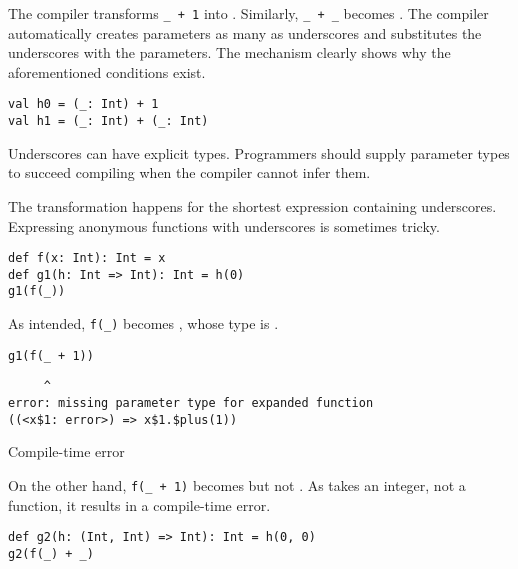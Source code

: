 The compiler transforms \verb!_ + 1! into .
Similarly, \verb!_ + _!
becomes . The compiler automatically creates parameters
as many as underscores and substitutes the underscores with the parameters. The
mechanism clearly shows why the aforementioned conditions exist.

\begin{verbatim}
val h0 = (_: Int) + 1
val h1 = (_: Int) + (_: Int)
\end{verbatim}

Underscores can have explicit types.
Programmers should supply parameter types to succeed compiling when
the compiler cannot infer them.

The transformation happens for the shortest expression containing underscores.
Expressing anonymous functions with underscores is sometimes tricky.

\begin{verbatim}
def f(x: Int): Int = x
def g1(h: Int => Int): Int = h(0)
g1(f(_))
\end{verbatim}

As intended, \verb!f(_)! becomes , whose type is .

\begin{verbatim}
g1(f(_ + 1))
\end{verbatim}
\vspace{-1em}
\begin{mdframed}[hidealllines=true,backgroundcolor=red!10,innerleftmargin=3pt,innerrightmargin=3pt,leftmargin=-3pt,rightmargin=-3pt]
\begin{verbatim}
     ^
error: missing parameter type for expanded function
((<x$1: error>) => x$1.$plus(1))
\end{verbatim}
\vspace{-2em}
\begin{flushright}
\scriptsize\textsf{Compile-time error}
\end{flushright}
\end{mdframed}

On the other hand, \verb!f(_ + 1)! becomes
 but not .
As  takes an integer, not a function, it results in a compile-time error.

\begin{verbatim}
def g2(h: (Int, Int) => Int): Int = h(0, 0)
g2(f(_) + _)
\end{verbatim}

